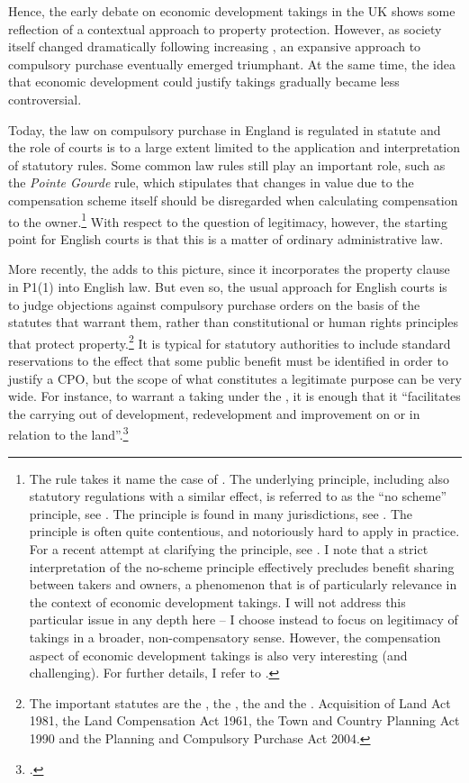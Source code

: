 Hence, the early debate on economic development takings in the UK shows some reflection of a contextual approach to property protection. However, as society itself changed dramatically following increasing , an expansive approach to compulsory purchase eventually emerged triumphant. At the same time, the idea that economic development could justify takings gradually became less controversial. 

Today, the law on compulsory purchase in England is regulated in statute and the role of courts is to a large extent limited to the application and interpretation of statutory rules. Some common law rules still play an important role, such as the {\it Pointe Gourde} rule, which stipulates that changes in value due to the compensation scheme itself should be disregarded when calculating compensation to the owner.\footnote{The rule takes it name the case of \cite{gourde47}. The underlying principle, including also statutory regulations with a similar effect, is referred to as the ``no scheme'' principle, see \cite{lawcom01}. The principle is found in many jurisdictions, see \cite{sluysmans14}. The principle is often quite contentious, and notoriously hard to apply in practice. For a recent attempt at clarifying the principle, see \cite{waters04}. I note that a strict interpretation of the no-scheme principle effectively precludes benefit sharing between takers and owners, a phenomenon that is of particularly relevance in the context of economic development takings. I will not address this particular issue in any depth here -- I choose instead to focus on legitimacy of takings in a broader, non-compensatory sense. However, the compensation aspect of economic development takings is also very interesting (and challenging). For further details, I refer to \cite{dyrkolbotn15}.} With respect to the question of legitimacy, however, the starting point for English courts is that this is a matter of ordinary administrative law.

More recently, the \cite{hra98} adds to this picture, since it incorporates the property clause in P1(1) into English law. But even so, the usual approach for English courts is to judge objections against compulsory purchase orders on the basis of the statutes that warrant them, rather than constitutional or human rights principles that protect property.\footnote{The important statutes are the \cite{ala81}, the \cite{lca61}, the \cite{tcpa90} and the \cite{pcpa04}. Acquisition of Land Act 1981, the Land Compensation Act 1961, the Town and Country Planning Act 1990 and the Planning and Compulsory Purchase Act 2004.} It is typical for statutory authorities to include standard reservations to the effect that some public benefit must be identified in order to justify a CPO, but the scope of what constitutes a legitimate purpose can be very wide. For instance, to warrant a taking under the \cite{tcpa90}, it is enough that it ``facilitates the carrying out of development, redevelopment and improvement on or in relation to the land''.\footcite[226]{tcpa90} 

